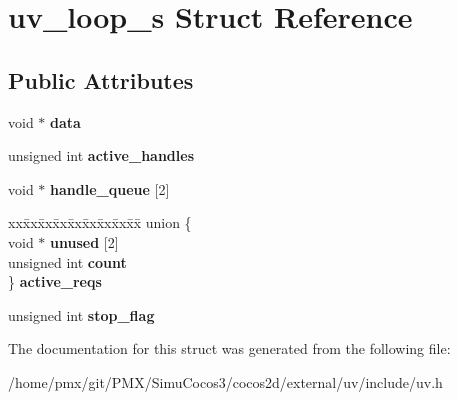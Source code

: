 \hypertarget{structuv__loop__s}{}\section{uv\+\_\+loop\+\_\+s Struct Reference}
\label{structuv__loop__s}
\subsection*{Public Attributes}
\begin{DoxyCompactItemize}
\item 
\mbox{\label{structuv__loop__s_aaeef0f8d2c764e9919504f76cdc13df1}} 
void $\ast$ {\bfseries data}
\item 
\mbox{\label{structuv__loop__s_ad864cd44352250a9fae85ae654a4f2e4}} 
unsigned int {\bfseries active\+\_\+handles}
\item 
\mbox{\label{structuv__loop__s_ab2fa25cbe860d335878ac7236efe91bc}} 
void $\ast$ {\bfseries handle\+\_\+queue} \mbox{[}2\mbox{]}
\item 
\mbox{\label{structuv__loop__s_acfbb4019c00e640ed0f311053908b77c}} 
\begin{tabbing}
xx\=xx\=xx\=xx\=xx\=xx\=xx\=xx\=xx\=\kill
union \{\\
\>void $\ast$ {\bfseries unused} \mbox{[}2\mbox{]}\\
\>unsigned int {\bfseries count}\\
\} {\bfseries active\_reqs}\\

\end{tabbing}\item 
\mbox{\label{structuv__loop__s_a2242d12da8a204da6ab203ff646d95ea}} 
unsigned int {\bfseries stop\+\_\+flag}
\end{DoxyCompactItemize}


The documentation for this struct was generated from the following file\+:\begin{DoxyCompactItemize}
\item 
/home/pmx/git/\+P\+M\+X/\+Simu\+Cocos3/cocos2d/external/uv/include/uv.\+h\end{DoxyCompactItemize}
